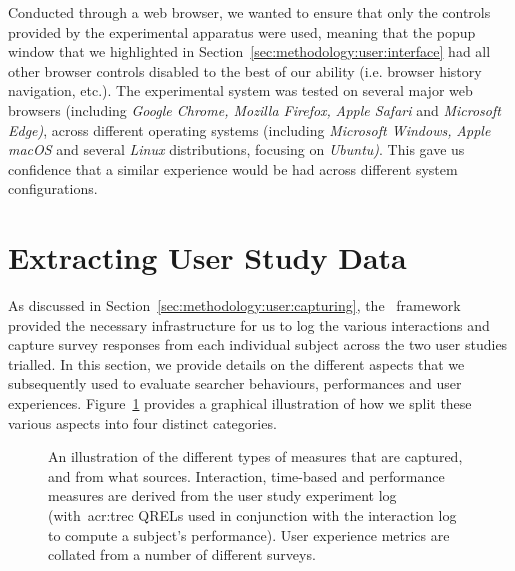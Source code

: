 Conducted through a web browser, we wanted to ensure that only the controls provided by the experimental apparatus were used, meaning that the popup window that we highlighted in Section~\ref{sec:methodology:user:interface} had all other browser controls disabled to the best of our ability (i.e. browser history navigation, etc.). The experimental system was tested on several major web browsers (including \emph{Google Chrome, Mozilla Firefox,} \emph{Apple Safari} and \emph{Microsoft Edge)}, across different operating systems (including \emph{Microsoft Windows,} \emph{Apple macOS} and several \emph{Linux} distributions, focusing on \emph{Ubuntu)}. This gave us confidence that a similar experience would be had across different system configurations.

\section{Extracting User Study Data}\label{sec:methodology:extracting}
As discussed in Section~\ref{sec:methodology:user:capturing}, the \treconomics~framework provided the necessary infrastructure for us to log the various interactions and capture survey responses from each individual subject across the two user studies trialled. In this section, we provide details on the different aspects that we subsequently used to evaluate searcher behaviours, performances and user experiences. Figure~\ref{fig:evaluation_methodology} provides a graphical illustration of how we split these various aspects into four distinct categories.

\begin{figure}[t!]
    \centering
    \caption[Examples of evaluation measures]{An illustration of the different types of measures that are captured, and from what sources. Interaction, time-based and performance measures are derived from the user study experiment log (with~\gls{acr:trec} QRELs used in conjunction with the interaction log to compute a subject's performance). User experience metrics are collated from a number of different surveys.}
    \label{fig:evaluation_methodology}
\end{figure}

